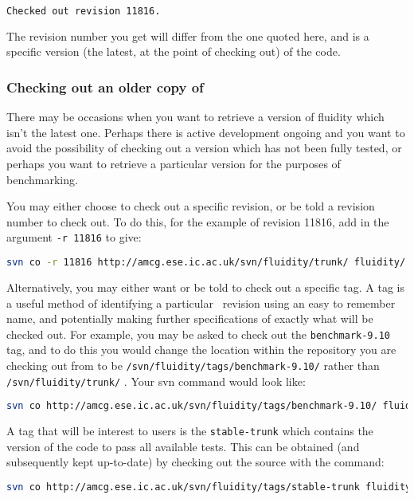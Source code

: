 \begin{lstlisting}[language=Bash]
Checked out revision 11816.
\end{lstlisting}

The revision number you get will differ from the one quoted here, and is a
specific version (the latest, at the point of checking out) of the \fluidity
code.

\subsubsection{Checking out an older copy of \fluidity}
\label{sect:subversion_checkout_old}

There may be occasions when you want to retrieve a version of fluidity which
isn't the latest one. Perhaps there is active development ongoing and you want
to avoid the possibility of checking out a version which has not been fully
tested, or perhaps you want to retrieve a particular version for the purposes
of benchmarking.

You may either choose to check out a specific revision, or be told a revision
number to check out. To do this, for the example of revision 11816, add in the
argument \lstinline[language=Bash]+-r 11816+ to give:

\begin{lstlisting}[language=Bash]
svn co -r 11816 http://amcg.ese.ic.ac.uk/svn/fluidity/trunk/ fluidity/
\end{lstlisting}

Alternatively, you may either want or be told to check out a specific \fluidity
tag. A tag is a useful method of identifying a particular \fluidity\ revision
using an easy to remember name, and potentially making further specifications 
of exactly what will be checked out. For example, you may be asked to check out
the \lstinline[language=Bash]+benchmark-9.10+ tag, and to do this you would
change the location within the repository you are checking out from to be
\lstinline[language=Bash]+/svn/fluidity/tags/benchmark-9.10/+ rather than
\lstinline[language=Bash]+/svn/fluidity/trunk/+ . Your svn command would look
like:

\begin{lstlisting}[language=Bash]
svn co http://amcg.ese.ic.ac.uk/svn/fluidity/tags/benchmark-9.10/ fluidity/
\end{lstlisting}

A tag that will be interest to users is the \lstinline[language=Bash]+stable-trunk+
which contains the version of the code to pass all available tests. This can be obtained
(and subsequently kept up-to-date) by checking out the source with the command:
\begin{lstlisting}[language=Bash]
svn co http://amcg.ese.ic.ac.uk/svn/fluidity/tags/stable-trunk fluidity/
\end{lstlisting}

